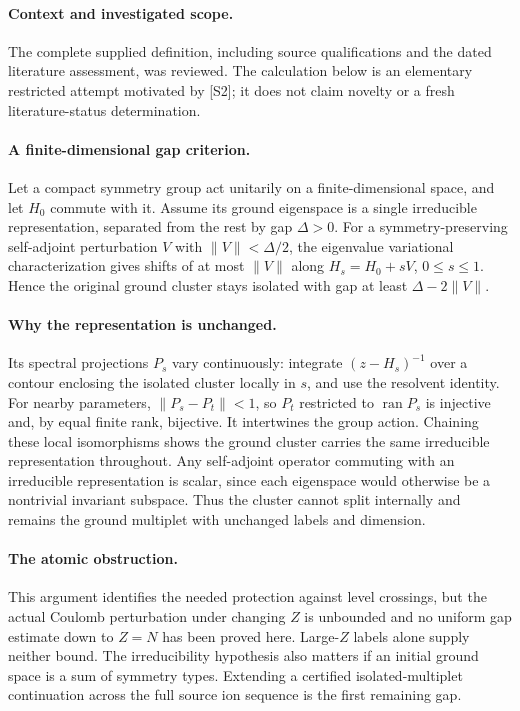 \documentclass[11pt]{article}
\begin{document}
\paragraph{Context and investigated scope.} The complete supplied definition, including source qualifications and the dated literature assessment, was reviewed. The calculation below is an elementary restricted attempt motivated by [S2]; it does not claim novelty or a fresh literature-status determination.

\paragraph{A finite-dimensional gap criterion.} Let a compact symmetry group act unitarily on a finite-dimensional space, and let $H_0$ commute with it. Assume its ground eigenspace is a single irreducible representation, separated from the rest by gap $\Delta>0$. For a symmetry-preserving self-adjoint perturbation $V$ with $\|V\|<\Delta/2$, the eigenvalue variational characterization gives shifts of at most $\|V\|$ along $H_s=H_0+sV$, $0\leq s\leq1$. Hence the original ground cluster stays isolated with gap at least $\Delta-2\|V\|$.

\paragraph{Why the representation is unchanged.} Its spectral projections $P_s$ vary continuously: integrate $(z-H_s)^{-1}$ over a contour enclosing the isolated cluster locally in $s$, and use the resolvent identity. For nearby parameters, $\|P_s-P_t\|<1$, so $P_t$ restricted to $\operatorname{ran}P_s$ is injective and, by equal finite rank, bijective. It intertwines the group action. Chaining these local isomorphisms shows the ground cluster carries the same irreducible representation throughout. Any self-adjoint operator commuting with an irreducible representation is scalar, since each eigenspace would otherwise be a nontrivial invariant subspace. Thus the cluster cannot split internally and remains the ground multiplet with unchanged labels and dimension.

\paragraph{The atomic obstruction.} This argument identifies the needed protection against level crossings, but the actual Coulomb perturbation under changing $Z$ is unbounded and no uniform gap estimate down to $Z=N$ has been proved here. Large-$Z$ labels alone supply neither bound. The irreducibility hypothesis also matters if an initial ground space is a sum of symmetry types. Extending a certified isolated-multiplet continuation across the full source ion sequence is the first remaining gap.
\end{document}
